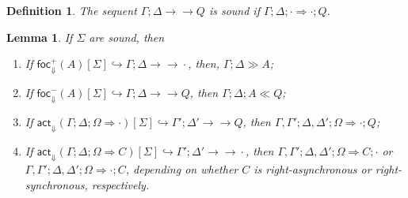 \documentclass{article}
\newtheorem{lemma}{Lemma}
\newtheorem{definition}{Definition}
\newcommand{\fneuseqsymb}{
  \mathrel{\longrightarrow\!\!\!\!\!\!\!\!\longrightarrow}}
\newcommand{\fneuseq}[3]{#1 ; #2 \fneuseqsymb #3}
\newcommand{\frfrel}[1]{\textsf{foc}^+_{\Downarrow}(#1)}
\newcommand{\flfrel}[1]{\textsf{foc}^-_{\Downarrow}(#1)}
\newcommand{\factrel}[1]{\textsf{act}_{\Downarrow}(#1)}
\newcommand{\relj}[3]{#1 [#2] \hookrightarrow #3}
\newcommand{\btriseq}[4]{#1; #2; #3 \Longrightarrow #4}
\newcommand{\rfocseq}[3]{#1; #2 \gg #3}
\newcommand{\lfocseq}[4]{#1; #2; #3 \ll #4}
\begin{document}
\begin{definition}
  The sequent $\fneuseq{\Gamma}{\Delta}{Q}$ is sound if
  $\btriseq{\Gamma}{\Delta}{\cdot}{\cdot ; Q}$.
\end{definition}

\begin{lemma}\label{fsoundnesslemma}
  If $\Sigma$ are sound, then

  \begin{enumerate}
  \item If $\relj{\frfrel{A}}{\Sigma}{\fneuseq{\Gamma}{\Delta}{\cdot}}$,
    then, $\rfocseq{\Gamma}{\Delta}{A}$;
  \item If $\relj{\flfrel{A}}{\Sigma}{\fneuseq{\Gamma}{\Delta}{Q}}$,
    then $\lfocseq{\Gamma}{\Delta}{A}{Q}$;
  \item If
    $\relj{\factrel{\btriseq{\Gamma}{\Delta}{\Omega}{\cdot}}}{\Sigma}
    {\fneuseq{\Gamma'}{\Delta'}{Q}}$, then
    $\btriseq{\Gamma, \Gamma'}{\Delta, \Delta'}{\Omega}{\cdot ; Q}$;
  \item If
    $\relj{\factrel{\btriseq{\Gamma}{\Delta}{\Omega}{C}}}{\Sigma}
    {\fneuseq{\Gamma'}{\Delta'}{\cdot}}$, then
    $\btriseq{\Gamma, \Gamma'}{\Delta, \Delta'}{\Omega}{C ; \cdot}$ or
    $\btriseq{\Gamma, \Gamma'}{\Delta, \Delta'}{\Omega}{\cdot ; C}$, depending
    on whether $C$ is right-asynchronous or right-synchronous, respectively.
  \end{enumerate}
\end{lemma}
\end{document}
